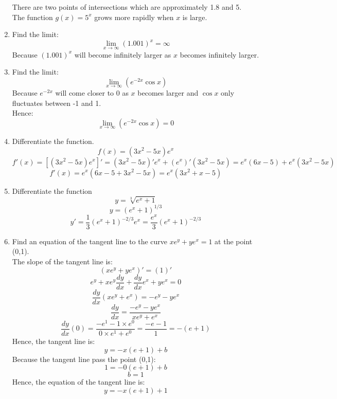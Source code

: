\documentclass[12pt]{article}
\begin{document}
\begin{enumerate}
\begin{center}
        \end{center}
        There are two points of intersections which are approximately 1.8 and 5.\\
        The function $g(x) = 5^x$ grows more rapidly when $x$ is large.

\setcounter{enumi}{22}
        \item Find the limit:
        \[\lim_{x\to\infty}(1.001)^x = \infty\]
        Because $(1.001)^x$ will become infinitely larger as $x$ becomes infinitely larger.

\setcounter{enumi}{28}
        \item Find the limit:
        \[\lim_{x\to\infty}(e^{-2x}\cos x)\]
        Because $e^{-2x}$ will come closer to 0 as $x$ becomes larger and $\cos x$ only fluctuates between -1 and 1.\\
        Hence:
        \[\lim_{x\to\infty}(e^{-2x}\cos x) = 0\]

\setcounter{enumi}{32}
        \item Differentiate the function.
        \[f(x) = (3x^2-5x)e^x\]
        \[f'(x) = [(3x^2-5x)e^x]' = (3x^2-5x)'e^x + (e^x)'(3x^2-5x) = e^x(6x-5) + e^x(3x^2-5x)\]
        \[f'(x) = e^x(6x-5+3x^2-5x) = e^x(3x^2 + x - 5)\]
    
\setcounter{enumi}{38}
        \item Differentiate the function
        \[y = \sqrt[3]{e^x + 1}\]
        \[y = (e^x+1)^{1/3}\]
        \[y' = \frac{1}{3}(e^x+1)^{-2/3}e^x = \frac{e^x}{3}(e^x+1)^{-2/3}\]

\setcounter{enumi}{53}
        \item Find an equation of the tangent line to the curve $xe^y + ye^x = 1$ at the point (0,1).\\
        The slope of the tangent line is:
        \[(xe^y + ye^x)' = (1)'\]
        \[e^y + xe^y\frac{dy}{dx} + \frac{dy}{dx}e^x + ye^x = 0\]
        \[\frac{dy}{dx}(xe^y + e^x) = -e^y - ye^x\]
        \[\frac{dy}{dx} = \frac{-e^y - ye^x}{xe^y + e^x}\]
        \[\frac{dy}{dx}(0) = \frac{-e^1 - 1\times e^0}{0\times e^1 + e^0} = \frac{-e-1}{1} = -(e+1)\]
        Hence, the tangent line is:
        \[y = -x(e+1) + b\]
        Because the tangent line pass the point (0,1):
        \[1 = -0(e+1) + b\]
        \[b = 1\]
        Hence, the equation of the tangent line is:
        \[y = -x(e+1) + 1\]


\end{enumerate}
\end{document}
